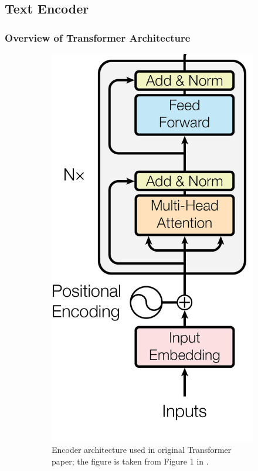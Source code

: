 \subsection{Text Encoder} \label{clip.text.encoder}

\subsubsection*{Overview of Transformer Architecture}
\begin{figure}[!htb]
\begin{subfigure}{0.5\textwidth}
    \centering
    \includegraphics[width=0.5\linewidth]{modeling/transformer.png}  
    \caption{Encoder architecture used in original Transformer paper; the figure is taken from Figure 1 in \cite{attentionAllYouNeed}.}
    \label{modeling.transformer.origEncoder}
\end{subfigure}
\hspace{5mm}
\begin{subfigure}{0.5\textwidth}
    \centering

\end{subfigure}
\end{figure}
